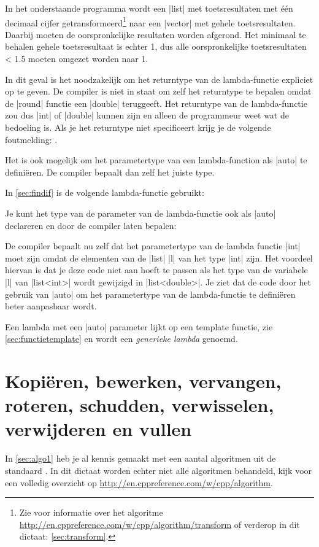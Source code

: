 \begin{cpplstShortInline}
In het onderstaande programma  wordt een |list| met toetsresultaten met één decimaal cijfer getransformeerd\footnote{%
	Zie voor informatie over het  algoritme \url{http://en.cppreference.com/w/cpp/algorithm/transform} of verderop in dit dictaat: \cref{sec:transform}.
} 
naar een |vector| met gehele toetsresultaten.
Daarbij moeten de oorspronkelijke resultaten worden afgerond.
Het minimaal te behalen gehele toetsresultaat is echter 1, dus alle oorspronkelijke toetsresultaten < 1.5 moeten omgezet worden naar 1.


In dit geval is het noodzakelijk om het returntype van de lambda\hyp{}functie expliciet op te geven.
De compiler is niet in staat om zelf het returntype te bepalen omdat de |round| functie een |double| teruggeeft.
Het returntype van de lambda\hyp{}functie zou dus |int| of |double| kunnen zijn en alleen de programmeur weet wat de bedoeling is.
Als je het returntype niet specificeert krijg je de volgende foutmelding: .

\label{sec:autolambdapar}
Het is ook mogelijk om het parametertype van een lambda\hyp{}function als |auto| te definiëren.%
De compiler bepaalt dan zelf het juiste type.

In \cref{sec:findif} is de volgende lambda\hyp{}functie gebruikt:

Je kunt het type van de parameter van de lambda\hyp{}functie ook als |auto| declareren en door de compiler laten bepalen:

De compiler bepaalt nu zelf dat het parametertype van de lambda functie |int| moet zijn omdat de elementen van de |list| |l| van het type |int| zijn.
Het voordeel hiervan is dat je deze code niet aan hoeft te passen als het type van de variabele |l| van |list<int>| wordt gewijzigd in |list<double>|.
Je ziet dat de code door het gebruik van |auto| om het parametertype van de lambda\hyp{}functie te definiëren beter aanpasbaar wordt.

Een lambda met een |auto| parameter lijkt op een template functie, zie \cref{sec:functietemplate} en wordt een \emph{generieke lambda} genoemd.

\section{Kopiëren, bewerken, vervangen, roteren, schudden, verwisselen, verwijderen en vullen}
\label{sec:algo2}
In \cref{sec:algo1} heb je al kennis gemaakt met een aantal algoritmen uit de standaard \Cpp{} .
In dit dictaat worden echter niet alle algoritmen behandeld, kijk voor een volledig overzicht op \url{http://en.cppreference.com/w/cpp/algorithm}.


\end{cpplstShortInline}
